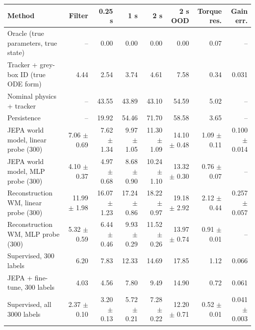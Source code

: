 \begin{tabular}{lrrrrrrr}
\toprule
Method & Filter & 0.25 s & 1 s & 2 s & 2 s OOD & Torque res. & Gain err.\\
\midrule
Oracle (true parameters, true state) & -- & 0.00 & 0.00 & 0.00 & 0.00 & 0.07 & --\\
Tracker + grey-box ID (true ODE form) & 4.44 & 2.54 & 3.74 & 4.61 & 7.58 & 0.34 & 0.031\\
Nominal physics + tracker & -- & 43.55 & 43.89 & 43.10 & 54.59 & 5.02 & --\\
Persistence & -- & 19.92 & 54.46 & 71.70 & 58.58 & 3.65 & --\\
JEPA world model, linear probe (300) & 7.06 $\pm$ 0.69 & 7.62 $\pm$ 1.34 & 9.97 $\pm$ 1.05 & 11.30 $\pm$ 1.09 & 14.10 $\pm$ 0.48 & 1.09 $\pm$ 0.11 & 0.100 $\pm$ 0.014\\
JEPA world model, MLP probe (300) & 4.10 $\pm$ 0.37 & 4.97 $\pm$ 0.68 & 8.68 $\pm$ 0.90 & 10.24 $\pm$ 1.10 & 13.32 $\pm$ 0.30 & 0.76 $\pm$ 0.07 & --\\
Reconstruction WM, linear probe (300) & 11.99 $\pm$ 1.98 & 16.07 $\pm$ 1.23 & 17.24 $\pm$ 0.86 & 18.22 $\pm$ 0.97 & 19.18 $\pm$ 2.92 & 2.12 $\pm$ 0.44 & 0.257 $\pm$ 0.057\\
Reconstruction WM, MLP probe (300) & 5.32 $\pm$ 0.59 & 6.44 $\pm$ 0.46 & 9.93 $\pm$ 0.29 & 11.52 $\pm$ 0.26 & 13.97 $\pm$ 0.74 & 0.91 $\pm$ 0.01 & --\\
Supervised, 300 labels & 6.20 & 7.83 & 12.33 & 14.69 & 17.85 & 1.12 & 0.066\\
JEPA + fine-tune, 300 labels & 4.03 & 4.56 & 7.80 & 9.49 & 14.90 & 0.72 & 0.061\\
Supervised, all 3000 labels & 2.37 $\pm$ 0.10 & 3.20 $\pm$ 0.13 & 5.72 $\pm$ 0.21 & 7.28 $\pm$ 0.22 & 12.20 $\pm$ 0.71 & 0.52 $\pm$ 0.01 & 0.041 $\pm$ 0.003\\
\bottomrule
\end{tabular}